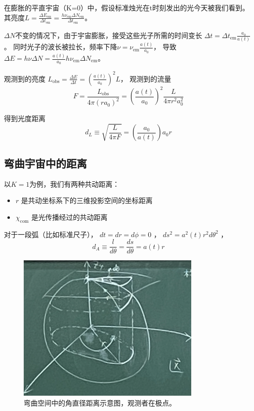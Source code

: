 \documentclass[12pt]{ctexart}
\begin{document}
在膨胀的平直宇宙（K=0）中，假设标准烛光在t时刻发出的光今天被我们看到。
其亮度$L=\frac{\Delta E_\text{em}}{\Delta t_\text{em}} = \frac{h\nu_\text{em} \Delta N_\text{em}}{\Delta t_\text{em}}$。

$\Delta N$不变的情况下，由于宇宙膨胀，接受这些光子所需的时间变长 $\Delta t = \Delta t_\text{em}\frac{a_0}{a(t)}$。
同时光子的波长被拉长，频率下降$\nu=\nu_\text{em}\frac{a(t)}{a_0}$，
导致$\Delta E = h\nu\Delta N=\frac{a(t)}{a_0}h \nu_\text{em} \Delta N_\text{em}$。

观测到的亮度 $L_\text{obs}=\frac{\Delta E}{\Delta t}=\left(\frac{a(t)}{a_0}\right)^2 L$，
观测到的流量
\begin{equation}
    F=\frac{L_\text{obs}}{4\pi (ra_0)^2}=\left(\frac{a(t)}{a_0}\right)^2 \frac{L}{4\pi r^2 a_0^2}
\end{equation}

得到光度距离
\begin{equation}
    d_L\equiv\sqrt{\frac{L}{4\pi F}}= \left(\frac{a_0}{a(t)}\right)a_0 r 
\end{equation} 

\subsection{弯曲宇宙中的距离}

以$K=1$为例，我们有两种共动距离：
\begin{itemize}
    \item $r$ 是共动坐标系下的三维投影空间的坐标距离
    \item $\chi_\text{com}$ 是光传播经过的共动距离
\end{itemize}

对于一段弧（比如标准尺子）， $dt=dr=d\phi = 0$ ， $ds^2=a^2(t)r^2d\theta^2$ ，
\begin{equation}
    d_A\equiv \frac{l}{d\theta} = \frac{ds}{d\theta} = a(t)r
\end{equation}

\begin{figure}[!hbtp]
    \centering
    \includegraphics[width=0.8\textwidth]{figures/d_A.png}
    \caption{弯曲空间中的角直径距离示意图，观测者在极点。}
\end{figure}
\end{document}
